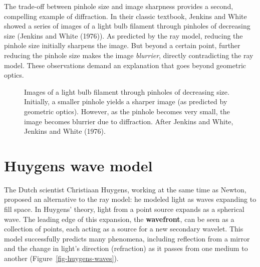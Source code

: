 \documentclass[
  letterpaper,
]{book}
\begin{document}
The trade-off between pinhole size and image sharpness provides a
second, compelling example of diffraction. In their classic textbook,
Jenkins and White showed a series of images of a light bulb filament
through pinholes of decreasing size (Jenkins and White (1976)). As
predicted by the ray model, reducing the pinhole size initially sharpens
the image. But beyond a certain point, further reducing the pinhole size
makes the image \emph{blurrier}, directly contradicting the ray model.
These observations demand an explanation that goes beyond geometric
optics.

\begin{figure}


\caption{\label{fig-diffraction-filaments}Images of a light bulb
filament through pinholes of decreasing size. Initially, a smaller
pinhole yields a sharper image (as predicted by geometric optics).
However, as the pinhole becomes very small, the image becomes blurrier
due to diffraction. After Jenkins and White, Jenkins and White (1976).}

\end{figure}%

\section{Huygens wave model}\label{sec-huygens-wave}

The Dutch scientist Christiaan Huygens, working at the same time as
Newton, proposed an alternative to the ray model: he modeled light as
waves expanding to fill space. In Huygens' theory, light from a point
source expands as a spherical wave. The leading edge of this expansion,
the \textbf{wavefront}, can be seen as a collection of points, each
acting as a source for a new secondary wavelet. This model successfully
predicts many phenomena, including reflection from a mirror and the
change in light's direction (refraction) as it passes from one medium to
another (Figure~\ref{fig-huygens-waves}).
\end{document}
